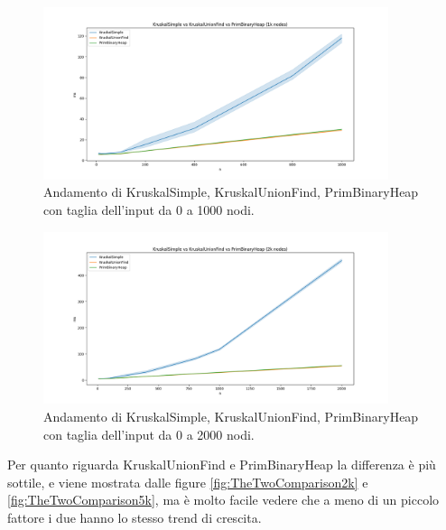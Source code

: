 \begin{figure}[H]
    \centering
    \includegraphics[width=0.9\textwidth]{./images/KruskalSimple_vs_KruskalUnionFind_vs_PrimBinaryHeap_(1k_nodes).png}
    \caption{Andamento di KruskalSimple, KruskalUnionFind, PrimBinaryHeap con taglia dell'input da 0 a 1000 nodi.}    
    \label{fig:TheThreeComparison1k}
\end{figure}

\begin{figure}[H]
    \centering
    \includegraphics[width=0.9\textwidth]{./images/KruskalSimple_vs_KruskalUnionFind_vs_PrimBinaryHeap_(2k_nodes).png}
    \caption{Andamento di KruskalSimple, KruskalUnionFind, PrimBinaryHeap con taglia dell'input da 0 a 2000 nodi.}
    \label{fig:TheThreeComparison2k}
\end{figure}

\noindent Per quanto riguarda KruskalUnionFind e PrimBinaryHeap la differenza è più sottile, 
e viene mostrata dalle figure \ref{fig:TheTwoComparison2k} e \ref{fig:TheTwoComparison5k}, ma è molto facile
vedere che a meno di un piccolo fattore i due hanno lo stesso trend di crescita.

